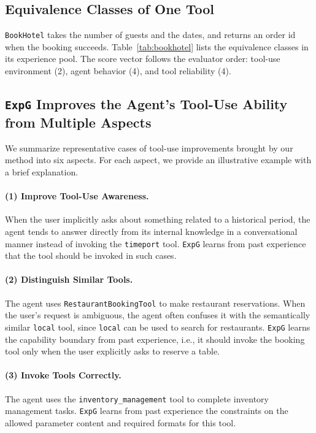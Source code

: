 \documentclass[11pt]{article}
\newcommand{\ours}{\texttt{ExpG}}
\begin{document}
\subsection{Equivalence Classes of One Tool}
\texttt{BookHotel} takes the number of guests and the dates, and returns an order id when the booking succeeds. Table~\ref{tab:bookhotel} lists the equivalence classes in its experience pool. The score vector follows the evaluator order: tool-use environment (2), agent behavior (4), and tool reliability (4).

\subsection{{\ours} Improves the Agent's Tool-Use Ability from Multiple Aspects}
We summarize representative cases of tool-use improvements brought by our method into six aspects. For each aspect, we provide an illustrative example with a brief explanation.
\paragraph{(1) Improve Tool-Use Awareness.}

When the user implicitly asks about something related to a historical period, the agent tends to answer directly from its internal knowledge in a conversational manner instead of invoking the \texttt{timeport} tool. {\ours} learns from past experience that the tool should be invoked in such cases.

\paragraph{(2) Distinguish Similar Tools.}
The agent uses \texttt{RestaurantBookingTool} to make restaurant reservations. When the user's request is ambiguous, the agent often confuses it with the semantically similar \texttt{local} tool, since \texttt{local} can be used to search for restaurants. {\ours} learns the capability boundary from past experience, i.e., it should invoke the booking tool only when the user explicitly asks to reserve a table.

\paragraph{(3) Invoke Tools Correctly.}
The agent uses the \texttt{inventory\_management} tool to complete inventory management tasks. {\ours} learns from past experience the constraints on the allowed parameter content and required formats for this tool.
\end{document}
